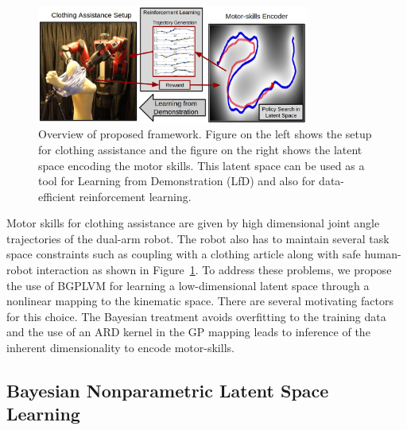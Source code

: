 \documentclass{article}
\begin{document}
\begin{figure}
  \centering
  \includegraphics[width=0.8\textwidth, height=0.2\textheight]{overview.png}
  \caption{Overview of proposed framework. Figure on the left shows the setup for clothing assistance and the figure on the right shows the latent space encoding the motor skills. This latent space can be used as a tool for Learning from Demonstration (LfD) and also for data-efficient reinforcement learning.}
  \label{figure:overview}
\end{figure}
Motor skills for clothing assistance are given by high dimensional joint angle trajectories of the dual-arm robot. The robot also has to maintain several task space constraints such as coupling with a clothing article along with safe human-robot interaction as shown in Figure~\ref{figure:overview}. To address these problems, we propose the use of BGPLVM for learning a low-dimensional latent space through a nonlinear mapping to the kinematic space. There are several motivating factors for this choice. The Bayesian treatment avoids overfitting to the training data and the use of an ARD kernel in the GP mapping leads to inference of the inherent dimensionality to encode motor-skills.

\subsection{Bayesian Nonparametric Latent Space Learning}
\label{section:bgplvm}
\end{document}
